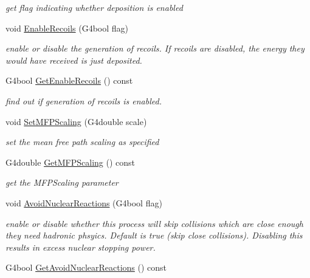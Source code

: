 \begin{DoxyCompactItemize}
\begin{DoxyCompactList}\small\item\em get flag indicating whether deposition is enabled \end{DoxyCompactList}\item 
void \hyperlink{classG4ScreenedNuclearRecoil_ab99bd0156eee60815ddba434a2bb9b0b}{Enable\-Recoils} (G4bool flag)
\begin{DoxyCompactList}\small\item\em enable or disable the generation of recoils. If recoils are disabled, the energy they would have received is just deposited. \end{DoxyCompactList}\item 
\hypertarget{classG4ScreenedNuclearRecoil_a4a4569aed4465249a0aa17f842e7ec01}{G4bool \hyperlink{classG4ScreenedNuclearRecoil_a4a4569aed4465249a0aa17f842e7ec01}{Get\-Enable\-Recoils} () const }\label{classG4ScreenedNuclearRecoil_a4a4569aed4465249a0aa17f842e7ec01}

\begin{DoxyCompactList}\small\item\em find out if generation of recoils is enabled. \end{DoxyCompactList}\item 
void \hyperlink{classG4ScreenedNuclearRecoil_afb077516aea7a307c456a9455368ed5f}{Set\-M\-F\-P\-Scaling} (G4double scale)
\begin{DoxyCompactList}\small\item\em set the mean free path scaling as specified \end{DoxyCompactList}\item 
\hypertarget{classG4ScreenedNuclearRecoil_a6e1a160fe83222c2bc7c9a5428cf4e50}{G4double \hyperlink{classG4ScreenedNuclearRecoil_a6e1a160fe83222c2bc7c9a5428cf4e50}{Get\-M\-F\-P\-Scaling} () const }\label{classG4ScreenedNuclearRecoil_a6e1a160fe83222c2bc7c9a5428cf4e50}

\begin{DoxyCompactList}\small\item\em get the M\-F\-P\-Scaling parameter \end{DoxyCompactList}\item 
void \hyperlink{classG4ScreenedNuclearRecoil_ad22e86de4211cbffd8788e05c022af92}{Avoid\-Nuclear\-Reactions} (G4bool flag)
\begin{DoxyCompactList}\small\item\em enable or disable whether this process will skip collisions which are close enough they need hadronic phsyics. Default is true (skip close collisions). Disabling this results in excess nuclear stopping power. \end{DoxyCompactList}\item 
\hypertarget{classG4ScreenedNuclearRecoil_a92e935e0c66bfa16608e64edb51077fa}{G4bool \hyperlink{classG4ScreenedNuclearRecoil_a92e935e0c66bfa16608e64edb51077fa}{Get\-Avoid\-Nuclear\-Reactions} () const }\label{classG4ScreenedNuclearRecoil_a92e935e0c66bfa16608e64edb51077fa}


\end{DoxyCompactItemize}

